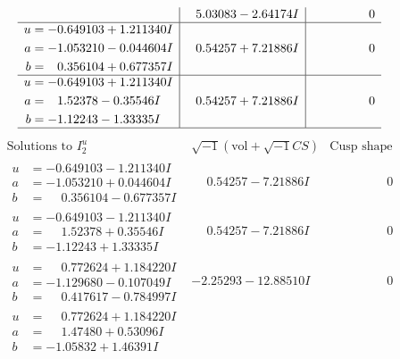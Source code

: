 \documentclass[1p]{elsarticle_modified}
\theoremstyle{definition}
\newcommand{\I}{\sqrt{-1}}
\begin{document}
$$\begin{array}{c|c|c}
 & \phantom{-}5.03083 - 2.64174 I & \phantom{-0.000000 } 0 \\ \hline\begin{aligned}
u &= -0.649103 + 1.211340 I \\
a &= -1.053210 - 0.044604 I \\
b &= \phantom{-}0.356104 + 0.677357 I\end{aligned}
 & \phantom{-}0.54257 + 7.21886 I & \phantom{-0.000000 } 0 \\ \hline\begin{aligned}
u &= -0.649103 + 1.211340 I \\
a &= \phantom{-}1.52378 - 0.35546 I \\
b &= -1.12243 - 1.33335 I\end{aligned}
 & \phantom{-}0.54257 + 7.21886 I & \phantom{-0.000000 } 0\\
 \hline 
 \end{array}$$\newpage$$\begin{array}{c|c|c}  
\text{Solutions to }I^u_{2}& \I (\text{vol} + \sqrt{-1}CS) & \text{Cusp shape}\\
 \hline 
\begin{aligned}
u &= -0.649103 - 1.211340 I \\
a &= -1.053210 + 0.044604 I \\
b &= \phantom{-}0.356104 - 0.677357 I\end{aligned}
 & \phantom{-}0.54257 - 7.21886 I & \phantom{-0.000000 } 0 \\ \hline\begin{aligned}
u &= -0.649103 - 1.211340 I \\
a &= \phantom{-}1.52378 + 0.35546 I \\
b &= -1.12243 + 1.33335 I\end{aligned}
 & \phantom{-}0.54257 - 7.21886 I & \phantom{-0.000000 } 0 \\ \hline\begin{aligned}
u &= \phantom{-}0.772624 + 1.184220 I \\
a &= -1.129680 - 0.107049 I \\
b &= \phantom{-}0.417617 - 0.784997 I\end{aligned}
 & -2.25293 - 12.88510 I & \phantom{-0.000000 } 0 \\ \hline\begin{aligned}
u &= \phantom{-}0.772624 + 1.184220 I \\
a &= \phantom{-}1.47480 + 0.53096 I \\
b &= -1.05832 + 1.46391 I\end{aligned}

\end{array}$$
\end{document}

